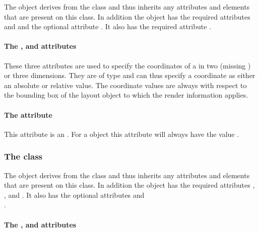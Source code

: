The \RenderPoint object derives from the \SBase class and thus inherits
any attributes and elements that are present on this class.
In addition the \RenderPoint object has the required attributes  and  and the optional attribute . It also has the required attribute .

\paragraph{The \fixttspace{}, \fixttspace{} and \fixttspace{} attributes}

These three attributes are used to specify the coordinates of a  \RenderPoint in two (missing ) or three dimensions. They are of type \RelAbsVector and can thus specify a coordinate as either an absolute or relative value. The coordinate
values are always with respect to the bounding box of the layout object to which the
render information applies.

\paragraph{The \fixttspace{} attribute}

This attribute is an . For a \RenderPoint object this attribute will always have the value .


\subsubsection{The  class}
\label{rendercubicbezier-class}


The \RenderCubicBezier object derives from the \RenderPoint class and
thus inherits any attributes and elements that are present on this
class.
In addition the \RenderCubicBezier object has the required attributes , ,  and . It also has the optional attributes  and \\ .

\paragraph{The \fixttspace{}, \fixttspace{} and \fixttspace{} attributes}

